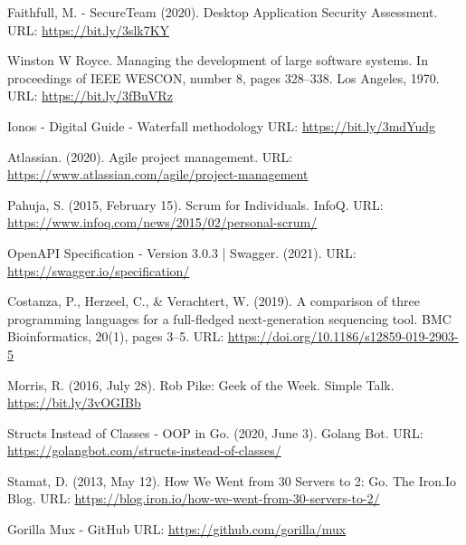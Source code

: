 \begin{thebibliography}{00}
    
 Faithfull, M. - SecureTeam (2020). Desktop Application Security Assessment.
\newline
URL: \url{https://bit.ly/3slk7KY}

 Winston W Royce. Managing the development of large software systems. In proceedings of IEEE WESCON, number 8,
pages 328–338. Los Angeles, 1970.
\newline
URL: \url{https://bit.ly/3fBuVRz}

 Ionos - Digital Guide - Waterfall methodology
\newline
URL: \url{https://bit.ly/3mdYudg}

 Atlassian. (2020). Agile project management.
\newline
URL: \url{https://www.atlassian.com/agile/project-management}

 Pahuja, S. (2015, February 15). Scrum for Individuals. InfoQ.
\newline
URL: \url{https://www.infoq.com/news/2015/02/personal-scrum/}

 OpenAPI Specification - Version 3.0.3 | Swagger. (2021). 
\newline
URL: \url{https://swagger.io/specification/}

 Costanza, P., Herzeel, C., \& Verachtert, W. (2019). A comparison of three programming languages for a full-fledged next-generation sequencing tool. BMC Bioinformatics, 20(1), pages 3–5. 
\newline
URL: \url{https://doi.org/10.1186/s12859-019-2903-5}

 Morris, R. (2016, July 28). Rob Pike: Geek of the Week. Simple Talk.
\url{https://bit.ly/3vOGIBb}

 Structs Instead of Classes - OOP in Go. (2020, June 3). Golang Bot.
\newline
URL: \url{https://golangbot.com/structs-instead-of-classes/}

 Stamat, D. (2013, May 12). How We Went from 30 Servers to 2: Go. The Iron.Io Blog.
\newline 
URL: \url{https://blog.iron.io/how-we-went-from-30-servers-to-2/}

 Gorilla Mux - GitHub
\newline
URL: \url{https://github.com/gorilla/mux}


\end{thebibliography}
